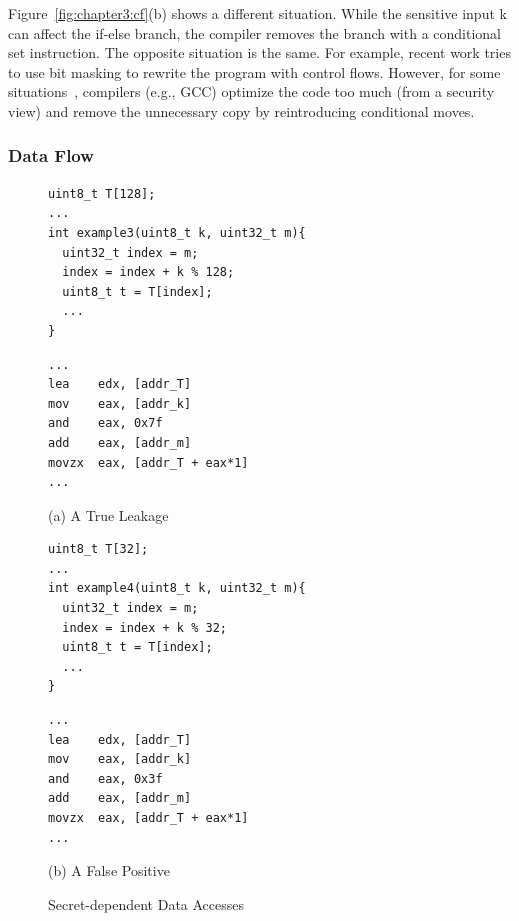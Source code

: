 Figure~\ref{fig:chapter3:cf}(b) shows a different situation. While the sensitive input \textsf{k} can affect the if-else branch, the compiler removes the branch with a conditional set instruction.  The opposite situation is the same. For example, recent work tries to use bit masking to rewrite the program with control flows. However, for some situations~\cite{Coppens:2009:PMT:1607723.1608124}, compilers (e.g., GCC) optimize the code too much (from a security view) and remove the unnecessary copy by reintroducing conditional moves.
\subsubsection{Data Flow}
\begin{figure}[h]
  \begin{minipage}{0.4\linewidth}
    \begin{lstlisting}[xleftmargin=.0\textwidth, xrightmargin=.0\textwidth, frame=none]
uint8_t T[128];
...
int example3(uint8_t k, uint32_t m){
  uint32_t index = m;
  index = index + k % 128;
  uint8_t t = T[index];
  ...
}
\end{lstlisting}
  \end{minipage}
  \hfill
  \begin{minipage}{0.4\linewidth}
    \begin{lstlisting}[xleftmargin=.0\textwidth, xrightmargin=.00\textwidth, frame=none, numbers=none, mathescape=true]
...
lea    edx, [addr_T]
mov    eax, [addr_k]
and    eax, 0x7f
add    eax, [addr_m]
movzx  eax, [addr_T + eax*1]
...
\end{lstlisting}
  \end{minipage}\caption*{(a) A True Leakage}

  \begin{minipage}{0.4\linewidth}
    \begin{lstlisting}[xleftmargin=.0\textwidth, xrightmargin=.0\textwidth, frame=none]
uint8_t T[32];
...
int example4(uint8_t k, uint32_t m){
  uint32_t index = m;
  index = index + k % 32;
  uint8_t t = T[index];
  ...
}
\end{lstlisting}
  \end{minipage}
  \hfill
  \begin{minipage}{0.4\linewidth}
    \begin{lstlisting}[xleftmargin=.0\textwidth, xrightmargin=.00\textwidth, frame=none, numbers=none, mathescape=true]
...
lea    edx, [addr_T]
mov    eax, [addr_k]
and    eax, 0x3f
add    eax, [addr_m]
movzx  eax, [addr_T + eax*1]
...
\end{lstlisting}
  \end{minipage}\caption*{(b) A False Positive}
  \caption{Secret-dependent Data Accesses}\label{fig:chapter3:da}
\end{figure}

